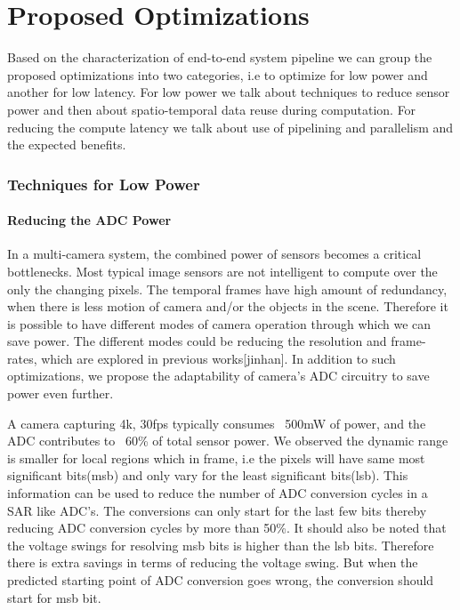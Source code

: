 \chapter{Proposed Optimizations}
\label{chap:PropOpt}
Based on the characterization of end-to-end system pipeline we can group the proposed optimizations into two categories, i.e to optimize for low power and another for low latency. For low power we talk about techniques to reduce sensor power and then about spatio-temporal data reuse during computation. For reducing the compute latency we talk about use of pipelining and parallelism and the expected benefits. 

\subsection{Techniques for Low Power}

\subsubsection{Reducing the ADC Power}
In a multi-camera system, the combined power of sensors becomes a critical bottlenecks. Most typical image sensors are not intelligent to compute over the only the changing pixels. The temporal frames have high amount of redundancy, when there is less motion of camera and/or the objects in the scene. Therefore it is possible to have different modes of camera operation through which we can save power. The different modes could be reducing the resolution and frame-rates, which are explored in previous works[jinhan]. In addition to such optimizations, we propose the adaptability of camera's ADC circuitry to save power even further. 

A camera capturing 4k, 30fps typically consumes ~500mW of power, and the ADC contributes to ~60\% of total sensor power. We observed the dynamic range is smaller for local regions which in frame, i.e the pixels will have same most significant bits(msb) and only vary for the least significant bits(lsb). This information can be used to reduce the number of ADC conversion cycles in a SAR like ADC's. The conversions can only start for the last few bits thereby reducing ADC conversion cycles by more than 50\%. It should also be noted that the voltage swings for resolving msb bits is higher than the lsb bits. Therefore there is extra savings in terms of reducing the voltage swing. But when the predicted starting point of ADC conversion goes wrong, the conversion should start for msb bit. 

